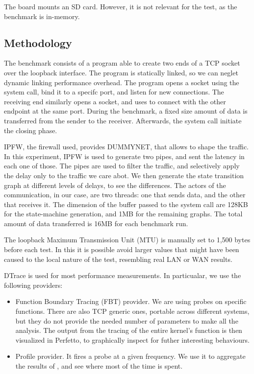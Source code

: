 \documentclass[a4paper,10pt]{article}
\begin{document}
The board mounts an SD card. However, it is not relevant for the test, as the benchmark is in-memory.
      

\subsection {Methodology}

The benchmark consists of a program able to create two ends of a TCP socket over the loopback interface. The program is statically linked, so we can neglet dynamic linking performance overhead. The program opens a socket using the  system call, bind it to a specifc port, and listen for new connections. The receiving end similarly opens a socket, and uses  to connect with the other endpoint at the same port. During the benchmark, a fixed size amount of data is transferred from the sender to the receiver. Afterwards, the  system call initiate the closing phase.

IPFW\cite{IPFW}, the firewall used, provides DUMMYNET, that allows to shape the traffic. In this experiment, IPFW is used to generate two pipes, and sent the latency in each one of those. The pipes are used to filter the traffic, and selectively apply the delay only to the traffic we care abot. We then generate the state transition graph at different levels of delays, to see the differences.
The actors of the communication, in our case, are two threads: one that sends data, and the other that receives it. The dimension of the buffer passed to the  system call are 128KB for the state-machine generation, and 1MB for the remaining graphs.
The total amount of data transferred is 16MB for each benchmark run.

The loopback Maximum Transmission Unit (MTU) is manually set to 1,500 bytes before each test. In this it is possible avoid larger values that might have been caused to the local nature of the test, resembling real LAN or WAN results.

DTrace is used for most performance measurements. In particualar, we use the following providers:

\begin{itemize}
   \item Function Boundary Tracing (FBT) provider. We are using probes on specific functions. There are also TCP generic ones, portable across different systems, but they do not provide the needed number of parameters to make all the analysis. The output from the tracing of the entire kernel's function is then visualized in Perfetto\cite{noauthor_perfetto_nodate}, to graphically inspect for futher interesting behaviours.
   \item Profile provider. It fires a probe at a given frequency. We use it to aggregate the results of , and see where most of the time is spent. 
\end{itemize}
\end{document}
